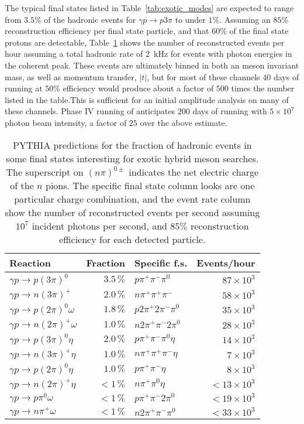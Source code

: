 The typical final states listed in Table~\ref{tab:exotic_modes} are expected to range from $3.5\%$ 
of the hadronic events for $\gamma p \rightarrow p 3\pi$ to under $1\%$. Assuming an $85\%$
reconstruction efficiency per final state particle, and that $60\%$ of the final state protons
are detectable, Table~\ref{tab:decay_rate_fractions} shows the number of reconstructed events per
hour assuming a total hadronic rate of 2~kHz for events with photon energies in the coherent
peak. These events are ultimately binned in both an meson invariant mass, as well as momentum
transfer, $|t|$, but for most of these channels $40$ days of running at $50\%$ efficiency would 
produce about a factor of $500$ times the number listed in the table.This is sufficient for
an initial amplitude analysis on many of these channels. Phase IV running of \GX{} anticipates 
$200$ days of running with $5\times  10^{7}$ photon beam intensity, a factor of $25$ over the
above estimate.

\begin{table}[h!]\centering
\caption[]{\label{tab:decay_rate_fractions}PYTHIA predictions for the fraction of hadronic events
in some final states interesting for exotic hybrid meson searches. The superscript on $(n\pi)^{0\pm}$
indicates the net electric charge of the $n$ pions. The specific final state column looks are one
particular charge combination, and the event rate column show the number of reconstructed events
per second assuming $10^{7}$ incident photons per second, and $85\%$ reconstruction efficiency
for each detected particle.}
\begin{tabular}{|l|r|l|r|}  \hline
Reaction & Fraction & Specific f.s. & Events/hour \\ \hline
$\gamma p \rightarrow p (3\pi)^{0}$ & $3.5\, \%$ & $p\pi^{+}\pi^{-}\pi^{0}$  & $87\times 10^{3}$ \\
$\gamma p \rightarrow n (3\pi)^{+}$ & $2.0\, \%$ & $n\pi^{+}\pi^{+}\pi^{-}$ & $58\times 10^{3}$ \\
$\gamma p \rightarrow p (2\pi)^{0}\omega$ & $1.8\, \%$ & $p2\pi^{+}2\pi^{-}\pi^{0}$ & $35\times 10^{3}$ \\
$\gamma p \rightarrow n (2\pi)^{+}\omega$ &  $1.0\, \%$ & $n2\pi^{+}\pi^{-}2\pi^{0}$ & $28\times 10^{3}$ \\
$\gamma p \rightarrow p (3\pi)^{0}\eta$ & $2.0\, \%$ & $p\pi^{+}\pi^{-}\pi^{0}\eta$ &  $14\times 10^{3}$ \\
$\gamma p \rightarrow n (3\pi)^{+}\eta$ &  $1.0\, \%$ & $n\pi^{+}\pi^{+}\pi^{-}\eta$ &  $7\times 10^{3}$ \\
$\gamma p \rightarrow p (2\pi)^{0}\eta$ & $1.0\, \%$ & $p\pi^{+}\pi^{-}\eta$ &  $8\times 10^{3}$ \\
$\gamma p \rightarrow n (2\pi)^{+}\eta$ &  $<1\, \%$ & $n\pi^{+}\pi^{0}\eta$ &  $<13\times 10^{3}$ \\
$\gamma p \rightarrow p \pi^{0}\omega$ & $<1\, \%$ & $p\pi^{+}\pi^{-}2\pi^{0}$ &  $<19\times 10^{3}$ \\
$\gamma p \rightarrow n \pi^{+}\omega$ &  $<1\, \%$ & $n2\pi^{+}\pi^{-}\pi^{0}$ &  $<33\times 10^{3}$ \\
\hline
\end{tabular} 
\end{table}
